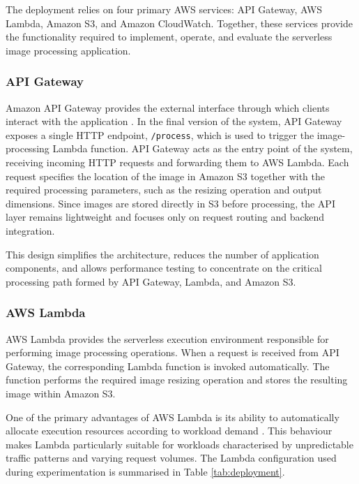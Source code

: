 \documentclass[11pt,a4paper,twocolumn]{article}
\begin{document}
The deployment relies on four primary AWS services: API Gateway, AWS Lambda, Amazon S3, and Amazon CloudWatch. 
Together, these services provide the functionality required to implement, operate, and evaluate the serverless 
image processing application.

\subsubsection{API Gateway}

Amazon API Gateway provides the external interface through which clients interact with the application 
\citep{aws_api_gateway_docs}. In the final version of the system, API Gateway exposes a single HTTP endpoint, 
\texttt{/process}, which is used to trigger the image-processing Lambda function.
API Gateway acts as the entry point of the system, receiving incoming HTTP requests and forwarding them to AWS 
Lambda. Each request specifies the location of the image in Amazon S3 together with the required processing 
parameters, such as the resizing operation and output dimensions. Since images are stored directly in S3 before 
processing, the API layer remains lightweight and focuses only on request routing and backend integration.

This design simplifies the architecture, reduces the number of application components, and allows performance 
testing to concentrate on the critical processing path formed by API Gateway, Lambda, and Amazon S3.

\subsubsection{AWS Lambda}

AWS Lambda provides the serverless execution environment responsible for performing image processing operations.
When a request is received from API Gateway, the corresponding Lambda function is invoked automatically. 
The function performs the required image resizing operation and stores the resulting image within Amazon S3.

One of the primary advantages of AWS Lambda is its ability to automatically allocate execution resources according 
to workload demand \citep{aws_lambda_docs, netto2014autoscaling}. This behaviour makes Lambda particularly suitable 
for workloads characterised by unpredictable traffic patterns and varying request volumes.
The Lambda configuration used during experimentation is summarised in Table \ref{tab:deployment}.
\end{document}
